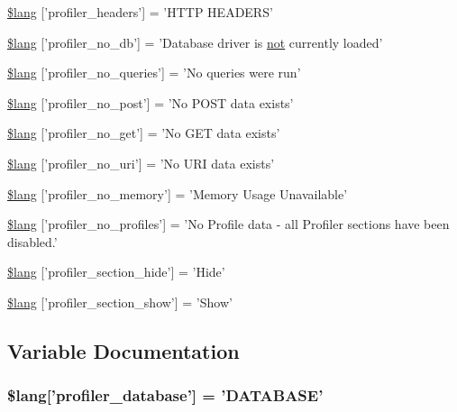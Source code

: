 \begin{DoxyCompactItemize}
\item 
\hyperlink{profiler__lang_8php_a079eb6971dec0c6115344e4b621e235f}{\$lang} \mbox{[}'profiler\-\_\-headers'\mbox{]} = 'H\-T\-T\-P H\-E\-A\-D\-E\-R\-S'
\item 
\hyperlink{profiler__lang_8php_a74da0e429477e757130da70e135d4ae9}{\$lang} \mbox{[}'profiler\-\_\-no\-\_\-db'\mbox{]} = 'Database driver is \hyperlink{mathquill_8js_ac1e1ab538c27d68cc2cbafea74e7412c}{not} currently loaded'
\item 
\hyperlink{profiler__lang_8php_a783abf2a3410bbc9c32e4b7bb774724b}{\$lang} \mbox{[}'profiler\-\_\-no\-\_\-queries'\mbox{]} = 'No queries were run'
\item 
\hyperlink{profiler__lang_8php_a06e8171d08be812398060c126233a237}{\$lang} \mbox{[}'profiler\-\_\-no\-\_\-post'\mbox{]} = 'No P\-O\-S\-T data exists'
\item 
\hyperlink{profiler__lang_8php_a8ecf037acbeb4a7b202b8238c8d1a328}{\$lang} \mbox{[}'profiler\-\_\-no\-\_\-get'\mbox{]} = 'No G\-E\-T data exists'
\item 
\hyperlink{profiler__lang_8php_ac7d16f2f99b12aeaa609be6bcb89759e}{\$lang} \mbox{[}'profiler\-\_\-no\-\_\-uri'\mbox{]} = 'No U\-R\-I data exists'
\item 
\hyperlink{profiler__lang_8php_a32345afdaa3f160ba1d21d03223313ad}{\$lang} \mbox{[}'profiler\-\_\-no\-\_\-memory'\mbox{]} = 'Memory Usage Unavailable'
\item 
\hyperlink{profiler__lang_8php_aabea841eed12fa8271f13656fa7d5457}{\$lang} \mbox{[}'profiler\-\_\-no\-\_\-profiles'\mbox{]} = 'No Profile data -\/ all Profiler sections have been disabled.'
\item 
\hyperlink{profiler__lang_8php_a137158ebe1d58bd53bbbb4594f2bc0ed}{\$lang} \mbox{[}'profiler\-\_\-section\-\_\-hide'\mbox{]} = 'Hide'
\item 
\hyperlink{profiler__lang_8php_a3e3b1984f57780efbdaf6d01dac31f3c}{\$lang} \mbox{[}'profiler\-\_\-section\-\_\-show'\mbox{]} = 'Show'
\end{DoxyCompactItemize}


\subsection{Variable Documentation}
\hypertarget{profiler__lang_8php_a93beea1bc75788ad2b7d3d3895984282}{
\subsubsection[{\$lang}]{\setlength{\rightskip}{0pt plus 5cm}\$lang\mbox{[}'profiler\-\_\-database'\mbox{]} = 'D\-A\-T\-A\-B\-A\-S\-E'}}\label{profiler__lang_8php_a93beea1bc75788ad2b7d3d3895984282}


